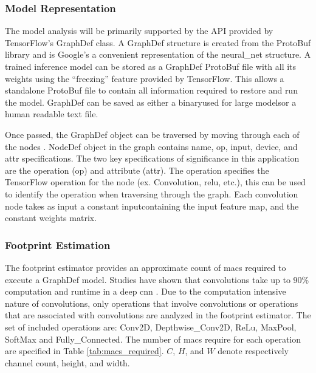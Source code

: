 \documentclass{uw-ece-wkrpt}
\begin{document}
\subsubsection{Model Representation}

The model analysis will be primarily supported by the API provided by TensorFlow's GraphDef class. A GraphDef structure is created from the ProtoBuf library and is Google's a convenient representation of the \gls{neural_net} structure. A trained inference model can be stored as a GraphDef ProtoBuf file with all its weights using the ``freezing'' feature provided by TensorFlow. This allows a standalone ProtoBuf file to contain all information required to restore and run the model. GraphDef can be saved as either a binary\textemdash{}used for large models\textemdash{}or a human readable text file.

Once passed, the GraphDef object can be traversed by moving through each of the nodes \cite{Google-Inc.2018A-Tool-Develope}. NodeDef object in the graph contains name, op, input, device, and attr specifications. The two key specifications of significance in this application are the operation (op) and attribute (attr). The operation specifies the TensorFlow operation for the node (ex. Convolution, \gls{relu}, etc.), this can be used to identify the operation when traversing through the graph. Each convolution node takes as input a constant input\textemdash{}containing the input feature map, and the constant weights matrix.

\subsubsection{Footprint Estimation}

The footprint estimator provides an approximate count of \glspl{mac} required to execute a GraphDef model. Studies have shown that convolutions take up to 90\% computation and runtime in a deep \gls{cnn} \cite{Wang2017Data-centric-co}. Due to the computation intensive nature of convolutions, only operations that involve convolutions or operations that are associated with convolutions are analyzed in the footprint estimator. The set of included operations are: Conv2D, Depthwise\_Conv2D, ReLu, MaxPool, SoftMax and Fully\_Connected. The number of \glspl{mac} require for each operation are specified in Table \ref{tab:macs_required}. $C$, $H$, and $W$ denote respectively channel count, height, and width.
\end{document}
